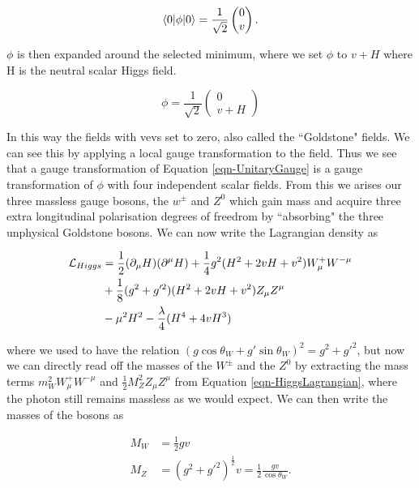 \begin{equation} \label{eqn-HiggsDoublet}
\braket{0|\phi|0} = \frac{1}{\sqrt{2}}
\begin{pmatrix}
0 \\
v
\end{pmatrix}.
\end{equation}

$\phi$ is then expanded around the selected minimum, where we set $\phi$ to $v + H$ where H is the neutral scalar Higgs field.

\begin{equation} \label{eqn-UnitaryGauge}
\phi = \frac{1}{\sqrt{2}}
\begin{pmatrix}
0 \\
v + H
\end{pmatrix}
\end{equation}

In this way the fields with vevs set to zero, also called the ``Goldstone" fields. We can see this by applying a local gauge transformation to the field. Thus we see that a gauge transformation of Equation \ref{eqn-UnitaryGauge} is a gauge transformation of $\phi$ with four independent scalar fields. From this we arises our three massless gauge bosons, the $w^{\pm}$ and $Z^0$ which gain mass and acquire three extra longitudinal polarisation degrees of freedrom by ``absorbing" the three unphysical Goldstone bosons. We can now write the Lagrangian density as 

\begin{equation} \label{eqn-HiggsLagrangian}
\begin{split}
\mathcal{L}_{Higgs} & = \frac{1}{2}(\partial_{\mu}H)(\partial^{\mu}H) + \frac{1}{4}g^2 (H^2 + 2vH + v^2) W^+_{\mu} W^{-\mu} \\
& + \frac{1}{8} (g^2 + g'^2) (H^2 + 2vH + v^2) Z_{\mu} Z^{\mu} \\
& - \mu^2 H^2 - \frac{\lambda}{4} (H^4 + 4vH^3)
\end{split}
\end{equation}

where we used to have the relation $(g\cos\theta_W + g'\sin\theta_W)^2 = g^2 + g'^2$, but now we can directly read off the masses of the $W^{\pm}$ and the $Z^0$ by extracting the mass terms $m^2_W W^+_{\mu}W^{-\mu}$ and $\frac{1}{2}M^2_Z Z_{\mu} Z^{\mu}$ from Equation \ref{eqn-HiggsLagrangian}, where the photon still remains massless as we would expect. We can then write the masses of the bosons as 

\begin{align}
M_W & = \frac{1}{2}gv \\
M_Z & = (g^2 + g'^2)^{\frac{1}{2}}v = \frac{1}{2} \frac{gv}{\cos\theta_W}.
\end{align}
 
